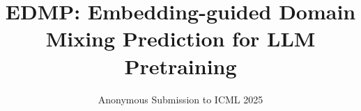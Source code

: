 \documentclass{article}
\title{EDMP: Embedding-guided Domain Mixing Prediction for LLM Pretraining}
\author{Anonymous Submission to ICML 2025}
\date{}
\begin{document}
\maketitle

\begin{abstract}

\end{abstract}











\end{document}
